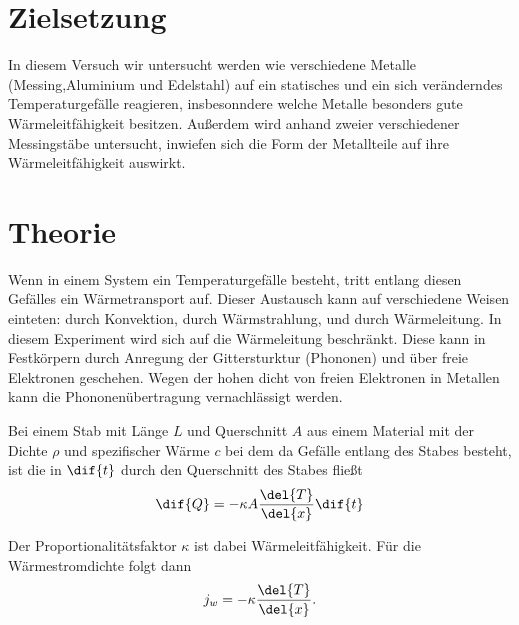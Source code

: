 \section{Zielsetzung}
In diesem Versuch wir untersucht werden wie verschiedene
Metalle (Messing,Aluminium und Edelstahl) auf ein statisches und ein sich veränderndes Temperaturgefälle reagieren,
insbesonndere welche Metalle besonders gute Wärmeleitfähigkeit besitzen. 
Außerdem wird anhand zweier verschiedener Messingstäbe untersucht, inwiefen 
sich die Form der Metallteile auf ihre Wärmeleitfähigkeit auswirkt.


\section{Theorie}
\label{sec:Theorie}

Wenn in einem System ein Temperaturgefälle besteht, tritt entlang diesen Gefälles ein Wärmetransport auf.
Dieser Austausch kann auf verschiedene Weisen einteten: durch Konvektion, durch Wärmstrahlung, und durch Wärmeleitung.
In diesem Experiment wird sich auf die Wärmeleitung beschränkt. Diese kann in Festkörpern durch Anregung der Gittersturktur (Phononen) und über freie Elektronen geschehen.
Wegen der hohen dicht von freien Elektronen in Metallen kann die Phononenübertragung vernachlässigt werden.

Bei einem Stab mit Länge $L$ und Querschnitt $A$ aus einem Material mit der Dichte $\rho$
und spezifischer Wärme $c$ bei dem da Gefälle entlang des Stabes besteht, ist die in $\dif{t}$ durch den Querschnitt des Stabes
fließt
\begin{equation}
  \dif{Q} = -\kappa A \frac{\del{T}}{\del{x}}\dif{t}
\end{equation}

Der Proportionalitätsfaktor $\kappa$ ist dabei Wärmeleitfähigkeit. Für die Wärmestromdichte folgt dann
\begin{equation}
  j_w = -\kappa \frac{\del{T}}{\del{x}}.
\end{equation}

